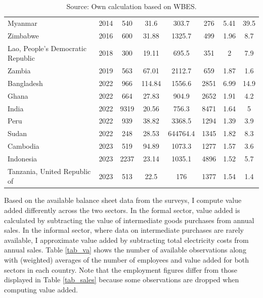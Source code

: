 \documentclass[letterpaper, 12pt]{article}
\begin{document}
\begin{table}[ht!]
\begin{tabular}{ll|ccc|ccc}
Myanmar & 2014 & 540 & 31.6 & 303.7 & 276 & 5.41 & 39.5 \\
Zimbabwe & 2016 & 600 & 31.88 & 1325.7 & 499 & 1.96 & 8.7 \\
Lao, People's Democratic Republic & 2018 & 300 & 19.11 & 695.5 & 351 & 2 & 7.9 \\
Zambia & 2019 & 563 & 67.01 & 2112.7 & 659 & 1.87 & 1.6 \\
Bangladesh & 2022 & 966 & 114.84 & 1556.6 & 2851 & 6.99 & 14.9 \\
Ghana & 2022 & 664 & 27.83 & 904.9 & 2652 & 1.91 & 4.2 \\
India & 2022 & 9319 & 20.56 & 756.3 & 8471 & 1.64 & 5 \\
Peru & 2022 & 939 & 38.82 & 3368.5 & 1294 & 1.39 & 3.9 \\
Sudan & 2022 & 248 & 28.53 & 644764.4 & 1345 & 1.82 & 8.3 \\
Cambodia & 2023 & 519 & 94.89 & 1073.3 & 1277 & 1.57 & 3.6 \\
Indonesia & 2023 & 2237 & 23.14 & 1035.1 & 4896 & 1.52 & 5.7 \\
Tanzania, United Republic of & 2023 & 513 & 22.5 & 176 & 1377 & 1.54 & 1.4 \\\hline
\hline
\end{tabular}
    \caption*{Source: Own calculation based on WBES.}
\end{table}

\noindent
Based on the available balance sheet data from the surveys, I compute value added differently across the two sectors. In the formal sector, value added is calculated by subtracting the value of intermediate goods purchases from annual sales. In the informal sector, where data on intermediate purchases are rarely available, I approximate value added by subtracting total electricity costs from annual sales. Table \ref{tab_va} shows the number of available observations along with (weighted) averages of the number of employees and value added for both sectors in each country. Note that the employment figures differ from those displayed in Table \ref{tab_sales} because some observations are dropped when computing value added.
\end{document}
